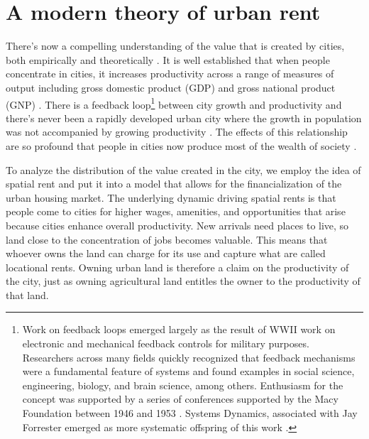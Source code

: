 \section{A modern theory of urban rent}
There's now a compelling understanding of the value that is created by cities, both empirically and theoretically \cite{jacobsEconomyCities1969, spenceUrbanizationGrowth2009, bettencourtIntroductionUrbanScience2021}. 
It is well established that when people concentrate in cities, it increases productivity across a range of measures of output including gross domestic product (GDP) and gross national product (GNP) \cite{bettencourtIntroductionUrbanScience2021}. There is a feedback loop\footnote{Work on feedback loops emerged largely as the result of WWII work on electronic and mechanical feedback controls for military purposes. Researchers across many fields %
quickly recognized that feedback mechanisms were a fundamental feature of systems and found examples in social science, engineering, biology, and brain science, among others. Enthusiasm for the concept was supported by a series of conferences supported by the Macy Foundation between 1946 and 1953 \cite{radzickiIntroductionFeedbackEconomics}.  %
Systems Dynamics, associated with Jay Forrester  emerged as more systematic offspring of this work \cite{forresterIndustrialDynamics1961, forresterUrbanDynamics1969}.} %
between city growth and productivity and there's never been a rapidly developed urban city where the growth in population was not accompanied by growing productivity \cite{annezUrbanizationGrowthSetting2009}.  %
The effects of this relationship are so profound that people in cities now produce most of the wealth of society \cite{bettencourtIntroductionUrbanScience2021}. %


To analyze the distribution of the value created in the city,  we employ the idea of spatial rent and put it into a model that allows for the financialization of the urban housing market. The underlying dynamic driving spatial rents is that people come to cities for higher wages, amenities, and opportunities that arise because cities enhance overall productivity. New arrivals need places to live, so land close to the concentration of jobs becomes valuable. This means that whoever owns the land can charge for its use and capture what are called \glspl{locational rent}. Owning urban land is therefore a claim on the productivity of the city, just as owning agricultural land entitles the owner to the productivity of that land. %



